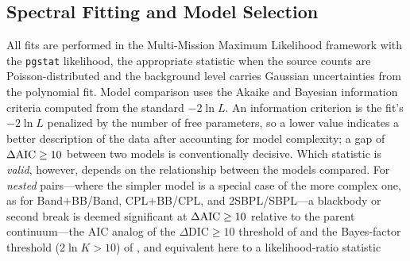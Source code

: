 \subsection{Spectral Fitting and Model Selection} \label{sec:fit}
All fits are performed in the Multi-Mission Maximum Likelihood framework
\citep[3ML;][]{Vianello2015} with the \texttt{pgstat} likelihood, the
appropriate statistic when the source counts are Poisson-distributed and the
background level carries Gaussian uncertainties from the polynomial fit. Model
comparison uses the Akaike and Bayesian information criteria
\citep[AIC, BIC;][]{Akaike1974,Schwarz1978} computed from the standard
$-2\ln L$. An information criterion is the fit's $-2\ln L$ penalized by the
number of free parameters, so a lower value indicates a better description of
the data after accounting for model complexity; a gap of $\Delta\mathrm{AIC}\ge10$ between
two models is conventionally decisive. Which statistic is \emph{valid},
however, depends on the relationship between the models compared. For \emph{nested} pairs---where the simpler model is a special case of the
more complex one, as for Band$+$BB/Band, CPL$+$BB/CPL, and 2SBPL/SBPL---a
blackbody or second break is deemed significant at $\Delta\mathrm{AIC}\ge10$ relative to the
parent continuum---the AIC analog of the $\Delta\mathrm{DIC}\ge10$ threshold of
\citet{Li2021} and the Bayes-factor threshold ($2\ln K>10$) of
\citet{Burgess2019}, and equivalent here to a likelihood-ratio statistic

